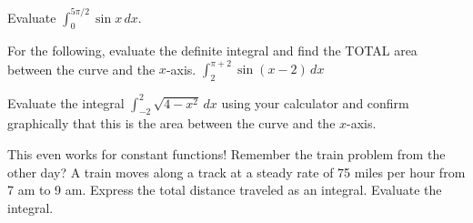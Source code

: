 \begin{questions}
    \question Evaluate $\displaystyle\int_0^{5\pi/2}\sin x\,dx$.
    
    For the following, evaluate the definite integral and find the TOTAL area between the curve and the $x$-axis.
    \question $\displaystyle\int_2^{\pi+2}\sin(x-2)\,dx$
    
    \question Evaluate the integral $\displaystyle\int_{-2}^{2}\sqrt{4-x^2}\,dx$ using your calculator and confirm graphically that this is the area between the curve and the $x$-axis.
    
    This even works for constant functions! Remember the train problem from the other day? A train moves along a track at a steady rate of 75 miles per hour from 7 am to 9 am. Express the total distance traveled as an integral. Evaluate the integral.
\end{questions}



\newpage
